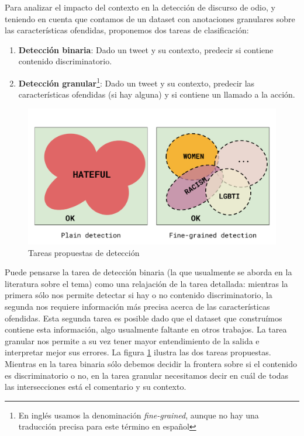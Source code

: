 Para analizar el impacto del contexto en la detección de discurso de odio, y teniendo en cuenta que contamos de un dataset con anotaciones granulares sobre las características ofendidas, proponemos dos tareas de clasificación:

\begin{enumerate}
    \item \textbf{Detección binaria}: Dado un tweet y su contexto, predecir si contiene contenido discriminatorio.
    \item \textbf{Detección granular}\footnote{En inglés usamos la denominación \emph{fine-grained}, aunque no hay una traducción precisa para este término en español}: Dado un tweet y su contexto, predecir las características ofendidas (si hay alguna) y si contiene un llamado a la acción.
\end{enumerate}

\begin{figure}[t]
    \centering
    \includegraphics[width=\textwidth]{img/hate_detection_tasks.pdf}
    \caption{Tareas propuestas de detección}
    \label{fig:hate_detection_tasks}
\end{figure}



Puede pensarse la tarea de detección binaria (la que usualmente se aborda en la literatura sobre el tema) como una relajación de la tarea detallada: mientras la primera sólo nos permite detectar si hay o no contenido discriminatorio, la segunda nos requiere información más precisa acerca de las características ofendidas. Esta segunda tarea es posible dado que el dataset que construímos contiene esta información, algo usualmente faltante en otros trabajos. La tarea granular nos permite a su vez tener mayor entendimiento de la salida e interpretar mejor sus errores. La figura \ref{fig:hate_detection_tasks} ilustra las dos tareas propuestas. Mientras en la tarea binaria sólo debemos decidir la frontera sobre si el contenido es discriminatorio o no, en la tarea granular necesitamos decir en cuál de todas las intersecciones está el comentario y su contexto.


